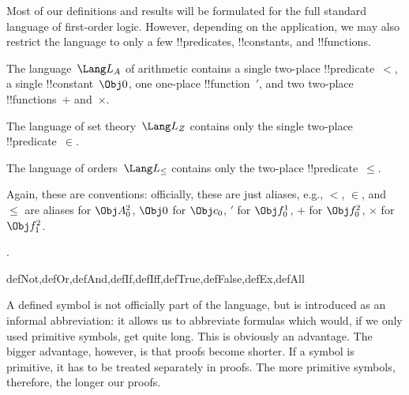 \documentclass[../../../include/open-logic-section]{subfiles}
\begin{document}
Most of our definitions and results will be formulated for the full
standard language of first-order logic.  However, depending on the
application, we may also restrict the language to only a few
!!{predicate}s, !!{constant}s, and !!{function}s.

\begin{ex}
The language~$\Lang L_A$ of arithmetic contains a single two-place
!!{predicate}~$<$, a single !!{constant}~$\Obj 0$, one one-place
!!{function}~$\prime$, and two two-place !!{function}s~$+$ and~$\times$.
\end{ex}

\begin{ex}
The language of set theory~$\Lang L_Z$ contains only the single
two-place !!{predicate}~$\in$.
\end{ex}

\begin{ex}
The language of orders~$\Lang L_\le$ contains only the two-place
!!{predicate}~$\le$.
\end{ex}

Again, these are conventions: officially, these are just aliases,
e.g., $<$, $\in$, and $\le$ are aliases for $\Obj A^2_0$, $\Obj 0$ for
$\Obj c_0$, $\prime$ for $\Obj f^1_0$, $+$ for $\Obj f^2_0$, $\times$ for
$\Obj f^2_1$.

.

\begin{tagblock}{defNot,defOr,defAnd,defIf,defIff,defTrue,defFalse,defEx,defAll}
\begin{explain}
A defined symbol is not officially part of the language, but is
introduced as an informal abbreviation: it allows us to abbreviate
formulas which would, if we only used primitive symbols, get quite
long.  This is obviously an advantage.  The bigger advantage, however,
is that proofs become shorter.  If a symbol is primitive, it has to be
treated separately in proofs. The more primitive symbols, therefore,
the longer our proofs.
\end{explain}
\end{tagblock}
\end{document}
